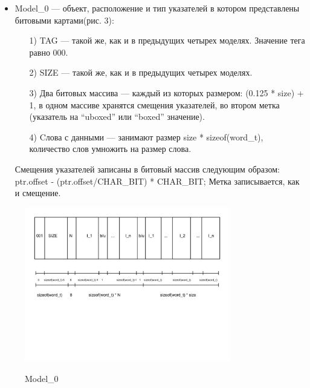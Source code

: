 \documentclass[12pt,a4paper]{article}
\begin{document}
\begin{itemize}
\item Model\_0 — объект, расположение и тип указателей в котором представлены битовыми картами(рис. 3):
\begin{enumerate}
\item[1)] TAG — такой же, как и в предыдущих четырех моделях. Значение тега равно 000.
\item[2)] SIZE — такой же, как и в предыдущих четырех моделях.
\item[3)] Два битовых массива —  каждый из которых размером: (0.125 * size) + 1, в одном массиве хранятся смещения указателей, во втором метка (указатель на ``uboxed'' или ``boxed''  значение).
\item[4)] Cлова с данными — занимают размер size * sizeof(word\_t), количество слов умножить на размер слова.
\end{enumerate}
Смещения указателей записаны в битовый массив следующим образом: ptr.offset - (ptr.offset/CHAR\_BIT) * CHAR\_BIT;
Метка записывается, как и смещение.
\end{itemize}
\begin{figure}[h]
\includegraphics[width=0.8\textwidth]{3}\\
\caption{Model\_0}
\end{figure}
\end{document}
